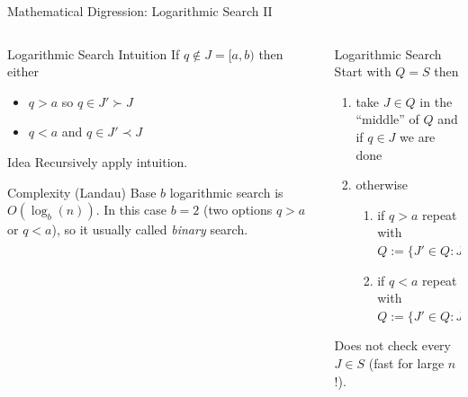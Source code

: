 \documentclass[xetex, handout]{beamer}
\begin{document}
\begin{frame}{Mathematical Digression: Logarithmic Search II}
  \begin{columns}
    \begin{column}{.5\linewidth}
      \begin{block}{Logarithmic Search Intuition}
        If $q \notin J = [a,b)$ then either
        \begin{itemize}
          \item $q > a$ so $q \in J' \succ J$
          \item $q < a$ and $q \in J' \prec J$
        \end{itemize}
      \end{block}
      \begin{alertblock}{Idea}
        Recursively apply intuition.
      \end{alertblock}
      \begin{block}{Complexity (Landau)}
        Base $b$ logarithmic search is $O(\log_b(n))$. In this case
        $b = 2$ (two options $q > a$ or $q < a$), so it usually called
        \emph{binary} search.
      \end{block}
    \end{column}
    \begin{column}{.5\linewidth}
      \begin{alertblock}{Logarithmic Search}
        Start with $Q = S$ then
        \begin{enumerate}
          \item take $J \in Q$ in the ``middle'' of $Q$ and if $q \in J$ we are done
          \item otherwise
            \begin{enumerate}
              \item if $q > a$ repeat with $Q := \{J' \in Q : J' \succ J\}$
              \item if $q < a$ repeat with $Q := \{J' \in Q : J' \prec J\}$
            \end{enumerate}
        \end{enumerate}
        Does not check every $J \in S$ (fast for large $n$!).
      \end{alertblock}
    \end{column}
  \end{columns}
\end{frame}
\end{document}
